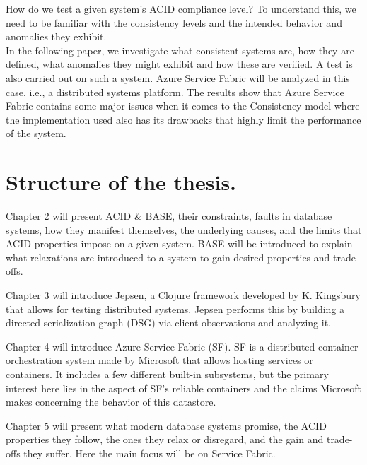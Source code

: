 \documentclass[a4paper,10pt,titlepage]{report}
\begin{document}
    \vspace{5mm}
    How do we test a given system's ACID compliance level? To understand this, we need to be familiar with the consistency levels and the intended behavior and anomalies they exhibit.\\
    \vspace{5mm}
    In the following paper, we investigate what consistent systems are, how they are defined, what anomalies they might exhibit and how these are verified. A test is also carried out on such a system. Azure Service Fabric will be analyzed in this case, i.e., a distributed systems platform. The results show that Azure Service Fabric contains some major issues when it comes to the Consistency model where the implementation used also has its drawbacks that highly limit the performance of the system.\\
    \vspace{5mm}
    \newpage
\section{Structure of the thesis.}

    Chapter 2 will present ACID \& BASE, their constraints, faults in database systems, how they manifest themselves, the underlying causes, and the limits that ACID properties impose on a given system. BASE will be introduced to explain what relaxations are introduced to a system to gain desired properties and trade-offs.\\
    \vspace{5mm}

    Chapter 3 will introduce Jepsen, a Clojure framework \cite{jepsonio} developed by K. Kingsbury that allows for testing distributed systems. Jepsen performs this by building a directed serialization graph (DSG) via client observations and analyzing it. \\
    \vspace{5mm}

    Chapter 4 will introduce Azure Service Fabric (SF). SF is a distributed container orchestration system made by Microsoft that allows hosting services or containers. It includes a few different built-in subsystems, but the primary interest here lies in the aspect of SF's reliable containers and the claims Microsoft makes concerning the behavior of this datastore.\\
    \vspace{5mm}

    Chapter 5 will present what modern database systems promise, the ACID properties they follow, the ones they relax or disregard, and the gain and trade-offs they suffer. Here the main focus will be on Service Fabric.\\
    \vspace{5mm}
\end{document}
